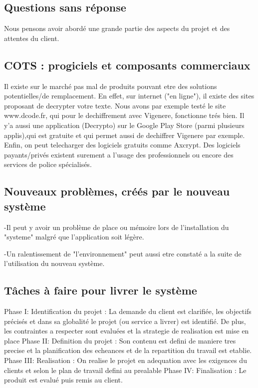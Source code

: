 \documentclass[a4]{article}
\begin{document}
		\subsection{Questions sans réponse}
		Nous pensons avoir abordé une grande partie des aspects du projet et des attentes du client.
		\subsection{COTS : progiciels et composants commerciaux}
		Il existe sur le marché pas mal de produits pouvant etre des solutions potentielles/de remplacement. En effet, 			sur internet
		("en ligne"), il existe des sites proposant de decrypter votre texte. Nous avons par exemple testé le site 			www.dcode.fr, qui
		pour le dechiffrement avec Vigenere, fonctionne trés bien.
		Il y'a aussi une application (Decrypto) sur le Google Play Store (parmi plusieurs applis),qui est gratuite et 			qui permet aussi de dechiffrer Vigenere par exemple.
		Enfin, on peut telecharger des logiciels gratuits comme Axcrypt. Des logiciels payants/privés existent surement 			a l'usage des
		professionnels ou encore des services de police spécialisés.
		\subsection{Nouveaux problèmes, créés par le nouveau système}
		-Il peut y avoir un problème de place ou mémoire lors de l'installation du "systeme" malgré que l'application 			soit légère.
		
		-Un ralentissement de "l'environnement" peut aussi etre constaté a la suite de l'utilisation du nouveau 			système.
		\subsection{Tâches à faire pour livrer le système}
		Phase I: Identification du projet : La demande du client est clarifiée, les objectifs précisés et dans sa 			globalité le projet (ou service a livrer) est identifié. De plus, les contraintes a respecter sont 				evaluées et la strategie de realisation est mise en place
		Phase II: Definition du projet : Son contenu est defini de maniere tres precise et la planification des 			echeances et de la repartition du travail est etablie.
		Phase III: Realisation : On realise le projet en adequation avec les exigences du clients et selon le plan de 			travail defini au prealable
		Phase IV: Finalisation : Le produit est evalué puis remis au client.
		
\end{document}
